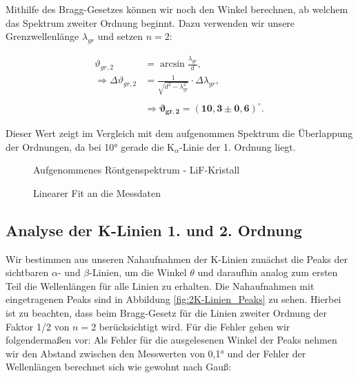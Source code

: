\documentclass{article}
\begin{document}
Mithilfe des Bragg-Gesetzes können wir noch den Winkel berechnen, ab welchem das Spektrum zweiter Ordnung beginnt. Dazu verwenden wir unsere Grenzwellenlänge $\lambda_{gr}$ und setzen $n=2$:

\begin{equation}
    \begin{split}
        \vartheta_{gr,2} &= \arcsin{\frac{\lambda_{gr}}{d}}, \\
        \Rightarrow \Delta \vartheta_{gr,2} &= \frac{1}{\sqrt{d^2 - \lambda_{gr}^2}} \cdot \Delta \lambda_{gr}, \\ \\
        &\Rightarrow \bm{\vartheta_{gr,2} = (10,3 \pm 0,6)^\circ}.  
    \end{split}
\end{equation}

Dieser Wert zeigt im Vergleich mit dem aufgenommen Spektrum die Überlappung der Ordnungen, da bei 10° gerade die K$_\alpha$-Linie der 1. Ordnung liegt. 

\begin{figure}[!p]
    \centering
    \caption{Aufgenommenes Röntgenspektrum - LiF-Kristall}
    \label{fig:1a}
\end{figure}

\begin{figure}[!p]
    \centering
    \caption{Linearer Fit an die Messdaten}
    \label{fig:1b}
\end{figure}

\clearpage
\newpage

\subsection{Analyse der K-Linien 1. und 2. Ordnung}

Wir bestimmen aus unseren Nahaufnahmen der K-Linien zunächst die Peaks der sichtbaren $\alpha$- und $\beta$-Linien, um die Winkel $\theta$ und daraufhin analog zum ersten Teil die Wellenlängen für alle Linien zu erhalten. Die Nahaufnahmen mit eingetragenen Peaks sind in Abbildung \ref{fig:2K-Linien_Peaks} zu sehen. Hierbei ist zu beachten, dass beim Bragg-Gesetz für die Linien zweiter Ordnung der Faktor 1/2 von $n=2$ berücksichtigt wird. Für die Fehler gehen wir folgendermaßen vor: Als Fehler für die ausgelesenen Winkel der Peaks nehmen wir den Abstand zwischen den Messwerten von 0,1° und der Fehler der Wellenlängen berechnet sich wie gewohnt nach Gauß:
\end{document}
